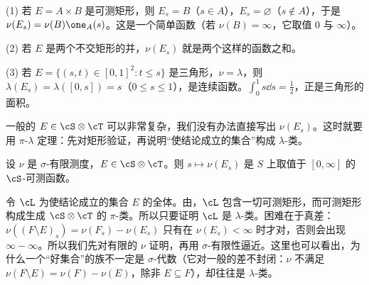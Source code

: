 \begin{example}[截口测度是什么样的函数]\label{ex:product:section-function}
(1) 若 $E=A\times B$ 是可测矩形，则 $E_s=B$（$s\in A$），$E_s=\varnothing$（$s\notin A$），于是 $\nu(E_s)=\nu(B)\one_A(s)$。这是一个简单函数（若 $\nu(B)=\infty$，它取值 $0$ 与 $\infty$）。

(2) 若 $E$ 是两个不交矩形的并，$\nu(E_s)$ 就是两个这样的函数之和。

(3) 若 $E=\{(s,t)\in[0,1]^2:t\leqslant s\}$ 是三角形，$\nu=\lambda$，则 $\lambda(E_s)=\lambda([0,s])=s$（$0\leqslant s\leqslant1$），是连续函数。$\int_0^1s\dd s=\frac12$，正是三角形的面积。

一般的 $E\in\cS\otimes\cT$ 可以非常复杂，我们没有办法直接写出 $\nu(E_s)$。这时就要用 $\pi$-$\lambda$ 定理：先对矩形验证，再说明“使结论成立的集合”构成 $\lambda$-类。
\end{example}

\begin{lemma}\label{lem:product:section-measurable}
设 $\nu$ 是 $\sigma$-有限测度，$E\in\cS\otimes\cT$。则 $s\mapsto\nu(E_s)$ 是 $S$ 上取值于 $[0,\infty]$ 的 $\cS$-可测函数。
\end{lemma}

\begin{remark}[证明思路]
令 $\cL$ 为使结论成立的集合 $E$ 的全体。由，$\cL$ 包含一切可测矩形，而可测矩形构成生成 $\cS\otimes\cT$ 的 $\pi$-类。所以只要证明 $\cL$ 是 $\lambda$-类。困难在于真差：$\nu((F\setminus E)_s)=\nu(F_s)-\nu(E_s)$ 只有在 $\nu(E_s)<\infty$ 时才对，否则会出现 $\infty-\infty$。所以我们先对有限的 $\nu$ 证明，再用 $\sigma$-有限性逼近。这里也可以看出，为什么一个“好集合”的族不一定是 $\sigma$-代数（它对一般的差不封闭：$\nu$ 不满足 $\nu(F\setminus E)=\nu(F)-\nu(E)$，除非 $E\subseteq F$），却往往是 $\lambda$-类。
\end{remark}

